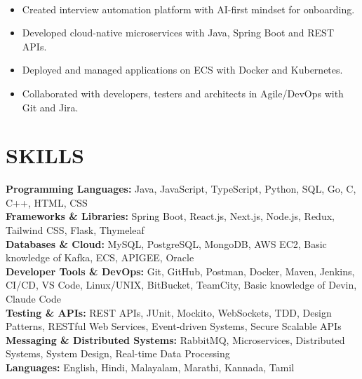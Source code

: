\documentclass[10pt,a4paper]{article}
\begin{document}
\noindent
{}\\[-12pt]

\begin{itemize}

\item Created interview automation platform with AI-first mindset for onboarding.

\item Developed cloud-native microservices with Java, Spring Boot and REST APIs.

\item Deployed and managed applications on ECS with Docker and Kubernetes.

\item Collaborated with developers, testers and architects in Agile/DevOps with Git and Jira.

\end{itemize}
\section*{SKILLS}

\small

\textbf{Programming Languages:}
Java, JavaScript, TypeScript, Python, SQL, Go, C, C++, HTML, CSS
\\[2pt]
\textbf{Frameworks \& Libraries:}
Spring Boot, React.js, Next.js, Node.js, Redux, Tailwind CSS, Flask, Thymeleaf
\\[2pt]
\textbf{Databases \& Cloud:}
MySQL, PostgreSQL, MongoDB, AWS EC2, Basic knowledge of Kafka, ECS, APIGEE, Oracle
\\[2pt]
\textbf{Developer Tools \& DevOps:}
Git, GitHub, Postman, Docker, Maven, Jenkins, CI/CD, VS Code, Linux/UNIX, BitBucket, TeamCity, Basic knowledge of Devin, Claude Code
\\[2pt]
\textbf{Testing \& APIs:}
REST APIs, JUnit, Mockito, WebSockets, TDD, Design Patterns, RESTful Web Services, Event-driven Systems, Secure Scalable APIs
\\[2pt]
\textbf{Messaging \& Distributed Systems:}
RabbitMQ, Microservices, Distributed Systems, System Design, Real-time Data Processing
\\[2pt]
\textbf{Languages:}
English, Hindi, Malayalam, Marathi, Kannada, Tamil
\end{document}
